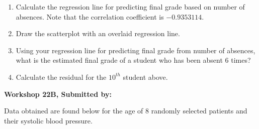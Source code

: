 \documentclass[11pt]{book}\usepackage[]{graphicx}\usepackage[]{color}
\begin{document}
\begin{exercises}
\begin{exercise}
\begin{enumerate}
  \item Calculate the regression line for predicting final grade based on number of absences.  Note that the correlation coefficient is $-0.9353114$.
	\item Draw the scatterplot with an overlaid regression line.
	\item Using your regression line for predicting final grade from number of absences, what is the estimated final grade of a student who has been absent 6 times?
	\item Calculate the residual for the $10^{th}$ student above.
\end{enumerate}

\end{exercise}
\begin{solution}  %

\end{solution}


\clearpage

    \begin{exercise}  %

    \begin{center}
\begin{flushleft}\textbf{\large \hfill Workshop 22B, Submitted by: }\end{flushleft}

\end{center}

Data obtained are found below for the age of 8 randomly selected patients and their systolic blood pressure.


\end{exercise}
\end{exercises}
\end{document}
